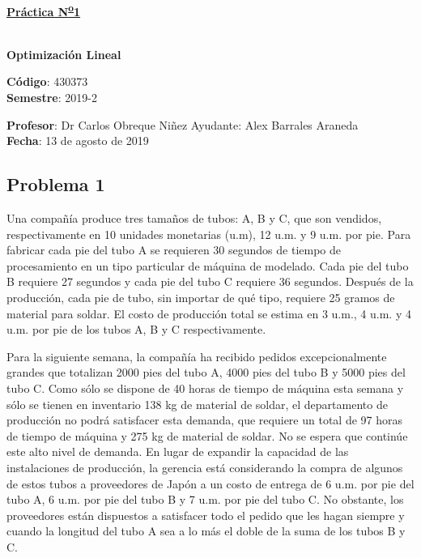 \documentclass[letterpaper]{article}
\begin{document}
\vspace*{0.5\baselineskip}
\begin{center}
\begin{Large}
\textbf{\underline{Práctica N\textsuperscript{\underline{o}}1}}
\end{Large}\\
\vspace*{0.5\baselineskip}
\textbf{Optimización Lineal} \\
\vspace*{0.5\baselineskip}
\begin{footnotesize}
\textbf{Código}: 430373\\
\textbf{Semestre}: 2019-2
\end{footnotesize}
\end{center}

\noindent \textbf{Profesor}: Dr Carlos Obreque Niñez  \hfill Ayudante: Alex Barrales Araneda\\
\noindent \textbf{Fecha}: 13 de agosto de 2019

\subsection*{Problema 1}
Una compañía produce tres tamaños de tubos: A, B y C, que son vendidos, respectivamente en 10 unidades monetarias (u.m), 12 u.m. y 9 u.m. por pie. Para fabricar cada pie del tubo A se requieren 30 segundos de tiempo de procesamiento en un tipo particular de máquina de modelado. Cada pie del tubo B requiere 27 segundos y cada pie del tubo C requiere 36 segundos. Después de la producción, cada pie de tubo, sin importar de qué tipo, requiere 25 gramos de material para soldar. El costo de producción total se estima en 3 u.m., 4 u.m. y 4 u.m. por pie de los tubos A, B y C respectivamente.

Para la siguiente semana, la compañía ha recibido pedidos excepcionalmente grandes que totalizan 2000 pies del tubo A, 4000 pies del tubo B y 5000 pies del tubo C. Como sólo se dispone de 40 horas de tiempo de máquina esta semana y sólo se tienen en inventario 138 kg de material de soldar, el departamento de producción no podrá satisfacer esta demanda, que requiere un total de 97 horas de tiempo de máquina y 275 kg de material de soldar. No se espera que continúe este alto nivel de demanda. En lugar de expandir la capacidad de las instalaciones de producción, la gerencia está considerando la compra de algunos de estos tubos a proveedores de Japón a un costo de entrega de 6 u.m. por pie del tubo A, 6 u.m. por pie del tubo B y 7 u.m. por pie del tubo C. No obstante, los proveedores están dispuestos a satisfacer todo el pedido que les hagan siempre y cuando la longitud del tubo A sea a lo más el doble de la suma de los tubos B y C.
\end{document}
